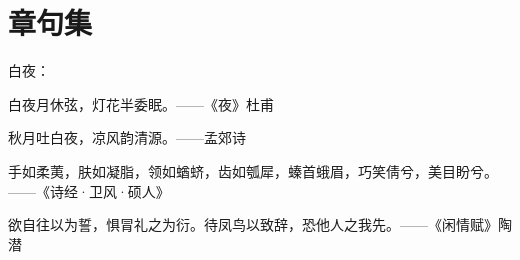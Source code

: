 \section{章句集}

白夜：

白夜月休弦，灯花半委眠。——《夜》杜甫

秋月吐白夜，凉风韵清源。——孟郊诗

手如柔荑，肤如凝脂，领如蝤蛴，齿如瓠犀，螓首蛾眉，巧笑倩兮，美目盼兮。——《诗经·卫风·硕人》

欲自往以为誓，惧冐礼之为衍。待凤鸟以致辞，恐他人之我先。——《闲情赋》陶潜



\newpage